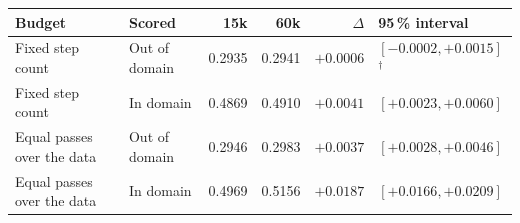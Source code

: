 \begin{tabular}{llrrrl}
\toprule
    \textbf{Budget} & \textbf{Scored} & \textbf{15k} & \textbf{60k} & \textbf{$\Delta$} & \textbf{95\,\% interval} \\
\midrule
    Fixed step count & Out of domain & 0.2935 & 0.2941 & $+0.0006$ & $[-0.0002, +0.0015]$$^{\dagger}$ \\
    Fixed step count & In domain & 0.4869 & 0.4910 & $+0.0041$ & $[+0.0023, +0.0060]$ \\
    Equal passes over the data & Out of domain & 0.2946 & 0.2983 & $+0.0037$ & $[+0.0028, +0.0046]$ \\
    Equal passes over the data & In domain & 0.4969 & 0.5156 & $+0.0187$ & $[+0.0166, +0.0209]$ \\
\bottomrule
\end{tabular}
